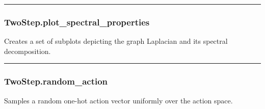 \begin{Shaded}
\begin{Highlighting}[]
\OperatorTok{=}\OperatorTok{=}\OperatorTok{=}\NormalTok{)}
\end{Highlighting}
\end{Shaded}

\begin{center}\rule{0.5\linewidth}{\linethickness}\end{center}

\hypertarget{twostep.plot_spectral_properties}{%
\subsubsection{TwoStep.plot\_spectral\_properties}\label{twostep.plot_spectral_properties}}

\begin{Shaded}
\begin{Highlighting}[]
\OperatorTok{=}\OperatorTok{=}\OperatorTok{=}\NormalTok{)}
\end{Highlighting}
\end{Shaded}

Creates a set of subplots depicting the graph Laplacian and its spectral
decomposition.

\begin{center}\rule{0.5\linewidth}{\linethickness}\end{center}

\hypertarget{twostep.random_action}{%
\subsubsection{TwoStep.random\_action}\label{twostep.random_action}}

\begin{Shaded}
\begin{Highlighting}[]
\NormalTok{)}
\end{Highlighting}
\end{Shaded}

Samples a random one-hot action vector uniformly over the action space.

